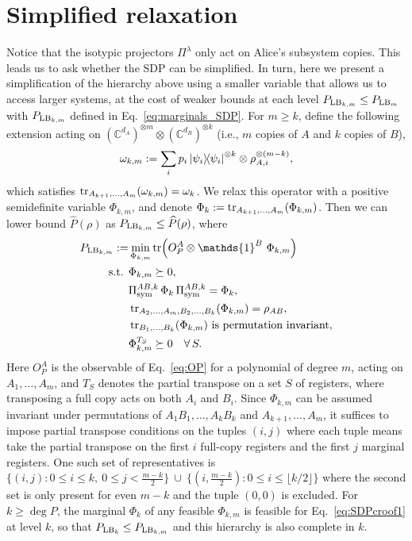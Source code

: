 \documentclass[aps,pra,twocolumn,showpacs,superscriptaddress,groupedaddress]{revtex4-2}
\newcommand{\one}[0]{\mathds{1}}
\newcommand{\C}{\mathds{C}}
\newcommand{\I}{\one}
\begin{document}
\section{Simplified relaxation}

Notice that the isotypic projectors $\Pi^\lambda$ only act on Alice's subsystem copies. This leads us to ask whether the SDP can be simplified. In turn, here we present a simplification of the hierarchy above using a smaller variable that allows us to access larger systems, at the cost of weaker bounds at each level $P_{{\rm LB}_{k,m}} \leq P_{{\rm LB}_m}$ with $P_{{\rm LB}_{k,m}}$ defined in Eq.~\eqref{eq:marginals_SDP}. For $m \geq k$, define the following extension acting on $(\C^{d_A})^{\otimes m}\otimes(\C^{d_B})^{\otimes k}$ (i.e., $m$ copies of $A$ and $k$ copies of $B$),
\begin{equation}
    \omega_{k,m} := \sum_i p_i \dyad{\psi_i}^{\otimes k}\otimes \rho_{A,i}^{\otimes (m-k)},
\end{equation}
which satisfies $\tr_{A_{k+1}, \dots, A_m}(\omega_{k,m})=\omega_k$. We relax this operator with a positive semidefinite variable $\Phi_{k,m}$, and denote $\Phi_{k}:=\tr_{A_{k+1}, \dots, A_m}(\Phi_{k,m})$.
Then we can lower bound $\widehat{P}(\rho)$ as $P_{{\rm LB}_{k,m}}\leq \widehat{P}(\rho)$, where
\begin{align}\label{eq:marginals_SDP}
    P_{{\rm LB}_{k,m}}:=&\min_{\Phi_{k,m}} \tr(O_P^A \otimes \I^B \ \Phi_{k,m})\\
    \text{s.t. } & \Phi_{k,m}\succeq 0, \nonumber\\
    & \Pi_\text{sym}^{AB,k} \, \Phi_{k}\, \Pi_\text{sym}^{AB,k}= \Phi_{k},\nonumber\\
    & \tr_{A_2,\dots,A_m,B_2,\dots,B_k} (\Phi_{k,m}) = \rho_{AB}, \nonumber\\
    & \tr_{B_1,\dots,B_k}(\Phi_{k,m}) \text{ is permutation invariant},\nonumber\\
    & \Phi_{k,m}^{T_S} \succeq 0 \quad  \forall \, S.\nonumber
\end{align}
Here $O_P^A$ is the observable of Eq.~\eqref{eq:OP} for a polynomial of degree $m$, acting on $A_1,\dots,A_m$, and $T_S$ denotes the partial transpose on a set $S$ of registers, where transposing a full copy acts on both $A_i$ and $B_i$. Since $\Phi_{k,m}$ can be assumed invariant under permutations of $A_1B_1, \dots, A_kB_k$ and $A_{k+1}, \dots, A_m$, it suffices to impose partial transpose conditions on the tuples $(i, j)$ where each tuple means take the partial transpose on the first $i$ full-copy registers and the first $j$ marginal registers. One such set of representatives is $\{(i,j):0\leq i\leq k,\ 0\leq j<\tfrac{m-k}{2}\}\ \cup\ \{(i,\tfrac{m-k}{2}):0\leq i\leq\lfloor k/2\rfloor\}$ where the second set is only present for even $m-k$ and the tuple $(0,0)$ is excluded.
For $k\geq\deg P$, the marginal $\Phi_k$ of any feasible $\Phi_{k,m}$ is feasible for Eq.~\eqref{eq:SDPcroof1} at level $k$, so that $P_{{\rm LB}_k}\leq P_{{\rm LB}_{k,m}}$ and this hierarchy is also complete in $k$.
\end{document}
